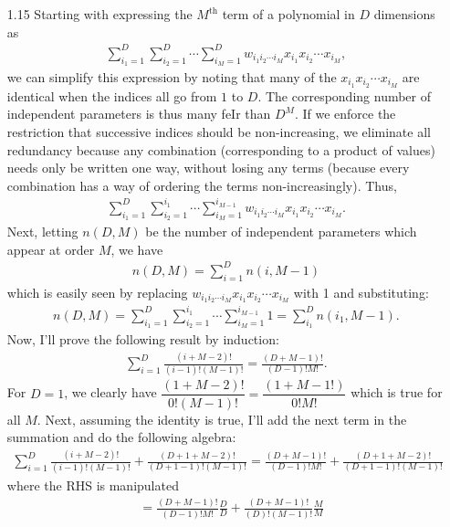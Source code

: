 \documentclass[]{article}
\begin{document}
\begin{enumerate}
 	\item[1.15] Starting with expressing the $M^\text{th}$ term of a polynomial in $D$ dimensions as
 	\begin{align*}
 	\sum_{i_1=1}^{D} \sum_{i_2=1}^{D} \cdots \sum_{i_M=1}^{D}w_{i_1i_2 \cdots i_M}x_{i_1}x_{i_2}\cdots x_{i_M}, 
 	\end{align*} 
 	we can simplify this expression by noting that many of the $x_{i_1}x_{i_2}\cdots x_{i_M}$ are identical when the indices all go from $1$ to $D$. The corresponding number of independent parameters is thus many feIr than $D^M$. If we enforce the restriction that successive indices should be non-increasing, we eliminate all redundancy because any combination (corresponding to a product of values) needs only be written one way, without losing any terms (because every combination has a way of ordering the terms non-increasingly). Thus, 
 	\begin{align*}
 	\sum_{i_1=1}^{D} \sum_{i_2=1}^{i_1} \cdots \sum_{i_M=1}^{i_{M-1}}w_{i_1i_2 \cdots i_M}x_{i_1}x_{i_2}\cdots x_{i_M}.
 	\end{align*}
 	Next, letting $n(D,M)$ be the number of independent parameters which appear at order $M$, we have
 	\begin{align*}
 	n(D,M)= \sum_{i=1}^{D}n(i, M-1) \tag{4}
 	\end{align*}
 	which is easily seen by replacing $w_{i_1i_2 \cdots i_M}x_{i_1}x_{i_2}\cdots x_{i_M}$ with 1 and substituting:
 	\begin{align*}
 	n(D,M) = \sum_{i_1=1}^{D} \sum_{i_2=1}^{i_1} \cdots \sum_{i_M=1}^{i_{M-1}}1 = \sum_{i_1}^{D} n(i_1, M-1).
 	\end{align*}
 	Now, I'll prove the following result by induction:
 	\begin{align*}
 	\sum_{i=1}^{D}\frac{(i + M - 2)!}{(i-1)!(M-1)!} = \frac{(D+M-1)!}{(D-1)!M!}. \tag{5}
 	\end{align*}
 	For $D=1$, we clearly have $\dfrac{(1 + M - 2)!}{0!(M-1)!}=\dfrac{(1 + M - 1!)}{0!M!}$ which is true for all $M$. Next, assuming the identity is true, I'll add the next term in the summation and do the following algebra:
 	\begin{align*}
 	\sum_{i=1}^{D}\frac{(i + M - 2)!}{(i-1)!(M-1)!} + \frac{(D+1+M-2)!}{(D+1-1)!(M-1)!} = \frac{(D+M-1)!}{(D-1)!M!} + \frac{(D+1+M-2)!}{(D+1-1)!(M-1)!}
 	\end{align*}
 	where the RHS is manipulated
 	\begin{align*}
 	&=\frac{(D+M-1)!}{(D-1)!M!}\frac{D}{D} + \frac{(D+M-1)!}{(D)!(M-1)!}\frac{M}{M} \\

\end{align*}
\end{enumerate}
\end{document}
